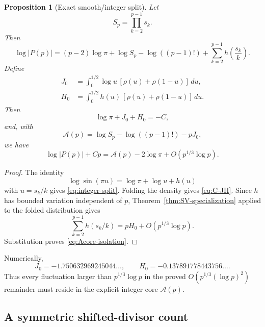 \documentclass[11pt]{amsart}
\numberwithin{equation}{section}
\newtheorem{proposition}[theorem]{Proposition}
\theoremstyle{definition}
\theoremstyle{remark}
\begin{document}
\begin{proposition}[Exact smooth/integer split]\label{prop:integer-split}
Let
\begin{equation}\label{eq:Sp-def}
 S_p=\prod_{k=2}^{p-1}s_k.
\end{equation}
Then
\begin{equation}\label{eq:integer-split}
 \log|P(p)|=(p-2)\log\pi+\log S_p-\log((p-1)!)
 +\sum_{k=2}^{p-1}h\!\left(\frac{s_k}{k}\right).
\end{equation}
Define
\begin{align}
 J_0&=\int_0^{1/2}\log u\,[\rho(u)+\rho(1-u)]\,du,
 \label{eq:J0-def}\\
 H_0&=\int_0^{1/2}h(u)\,[\rho(u)+\rho(1-u)]\,du.
 \label{eq:H0-def}
\end{align}
Then
\begin{equation}\label{eq:C-JH}
 \log\pi+J_0+H_0=-C,
\end{equation}
and, with
\begin{equation}\label{eq:Acore-def}
 \mathcal A(p)=\log S_p-\log((p-1)!)-pJ_0,
\end{equation}
we have
\begin{equation}\label{eq:Acore-isolation}
 \log|P(p)|+Cp
 =\mathcal A(p)-2\log\pi+O(p^{1/3}\log p).
\end{equation}
\end{proposition}

\begin{proof}
The identity
\[
 \log\sin(\pi u)=\log\pi+\log u+h(u)
\]
with \(u=s_k/k\) gives \eqref{eq:integer-split}.  Folding the density gives
\eqref{eq:C-JH}.  Since \(h\) has bounded variation independent of \(p\),
Theorem~\ref{thm:SV-specialization} applied to the folded distribution gives
\[
 \sum_{k=2}^{p-1}h(s_k/k)=pH_0+O(p^{1/3}\log p).
\]
Substitution proves \eqref{eq:Acore-isolation}.
\end{proof}

Numerically,
\begin{equation}\label{eq:JH-numerical}
 J_0=-1.750632969245044\ldots,
 \qquad H_0=-0.137891778443756\ldots.
\end{equation}
Thus every fluctuation larger than \(p^{1/3}\log p\) in the proved
\(O(p^{1/3}(\log p)^2)\) remainder must reside in the explicit integer
core \(\mathcal A(p)\).

\subsection{A symmetric shifted-divisor count}
\end{document}
